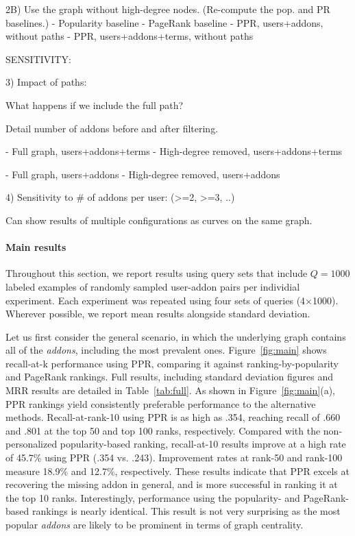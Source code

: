 \documentclass[11pt,oneside]{book}
\begin{document}
2B) Use the graph without high-degree nodes. (Re-compute the pop. and PR baselines.)
- Popularity baseline
- PageRank baseline
- PPR, users+addons, without paths
- PPR, users+addons+terms, without paths

SENSITIVITY:

3) Impact of paths:

What happens if we include the full path?

Detail number of addons before and after filtering. 

- Full graph, users+addons+terms
- High-degree removed, users+addons+terms

- Full graph, users+addons
- High-degree removed, users+addons

4) Sensitivity to # of addons per user: (>=2, >=3, ..)

Can show results of multiple configurations as curves on the same graph.
\fi

\paragraph{Main results}

Throughout this section, we report results using query sets that include $Q=1000$ labeled examples of randomly sampled user-addon pairs per individial experiment. Each experiment was repeated using four sets of queries (4$\times$1000). Wherever possible, we report mean results alongside standard deviation.  

Let us first consider the general scenario, in which the underlying graph contains all of the {\it addons}, including the most prevalent ones. Figure~\ref{fig:main} shows recall-at-k performance using PPR, comparing it against ranking-by-popularity and PageRank rankings. Full results, including standard deviation figures and MRR results are detailed in Table~\ref{tab:full}.
As shown in Figure~\ref{fig:main}(a), PPR rankings yield consistently preferable performance to the alternative methods. Recall-at-rank-10 using PPR is as high as .354, reaching recall of .660 and .801 at the top 50 and top 100 ranks, respectively. Compared with the non-personalized popularity-based ranking, recall-at-10 results improve at a high rate of 45.7\% using PPR (.354 vs. .243). Improvement rates at rank-50 and rank-100 measure 18.9\% and 12.7\%, respectively. These results indicate that PPR excels at recovering the missing addon in general, and is more successful in ranking it at the top 10 ranks.  Interestingly, performance using the popularity- and PageRank-based rankings is nearly identical. This result is not very surprising as the most popular {\it addons} are likely to be prominent in terms of graph centrality. 
\end{document}
